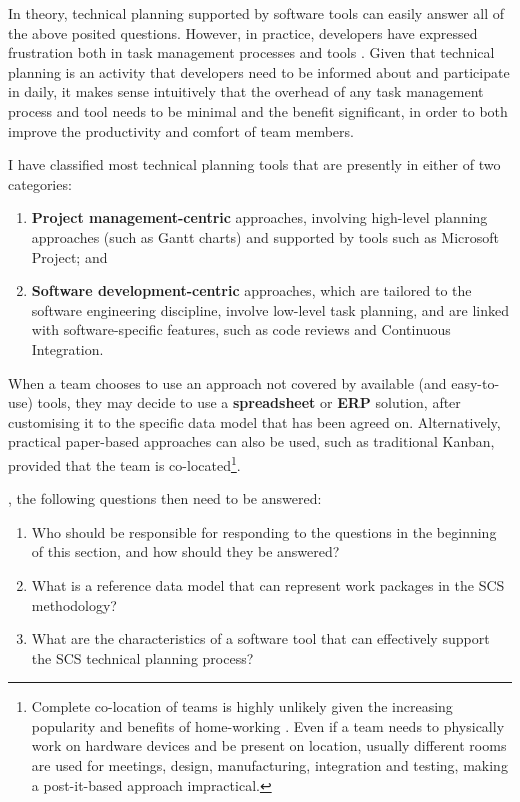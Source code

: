 \documentclass[a4paper,nobib,justified,final]{tufte-book}
\begin{document}
In theory, technical planning supported by software tools can easily answer all of the above posited questions. However, in practice, developers have expressed frustration both in task management processes \autocite{singhExploringLivedExperiences2023} and tools \autocite{hadiCriticalSuccessFactors2021a,johanssonHowCanAtlassian2017,correiadasilvaOptimizingUserExperience2025}. Given that technical planning is an activity that developers need to be informed about and participate in daily, it makes sense intuitively that the overhead of any task management process and tool needs to be minimal and the benefit significant, in order to both improve the productivity and comfort of team members.

I have classified most technical planning tools that are presently in either of two categories:\begin{enumerate}[itemsep=-2ex]
	\item \textbf{Project management-centric} approaches, involving high-level planning approaches (such as Gantt charts) and supported by tools such as Microsoft Project; and
	\item \textbf{Software development-centric} approaches, which are tailored to the software engineering discipline, involve low-level task planning, and are linked with software-specific features, such as code reviews and Continuous Integration.
\end{enumerate}
When a team chooses to use an approach not covered by available (and easy-to-use) tools, they may decide to use a \textbf{spreadsheet} or \textbf{\acf{ERP}} solution, after customising it to the specific data model that has been agreed on. Alternatively, practical paper-based approaches can also be used, such as traditional Kanban, provided that the team is co-located\footnote{Complete co-location of teams is highly unlikely given the increasing popularity and benefits of home-working \cite{honore-livermoreManagingProductDevelopment2021}. Even if a team needs to physically work on hardware devices and be present on location, usually different rooms are used for meetings, design, manufacturing, integration and testing, making a post-it-based approach impractical.\label{txt:colocation}}.

, the following questions then need to be answered:\begin{enumerate}[itemsep=-2ex]
	\item Who should be responsible for responding to the questions in the beginning of this section, and how should they be answered?
	\item What is a reference data model that can represent work packages in the \acs{SCS} methodology?
	\item What are the characteristics of a software tool that can effectively support the \acs{SCS} technical planning process?
\end{enumerate}
\end{document}
